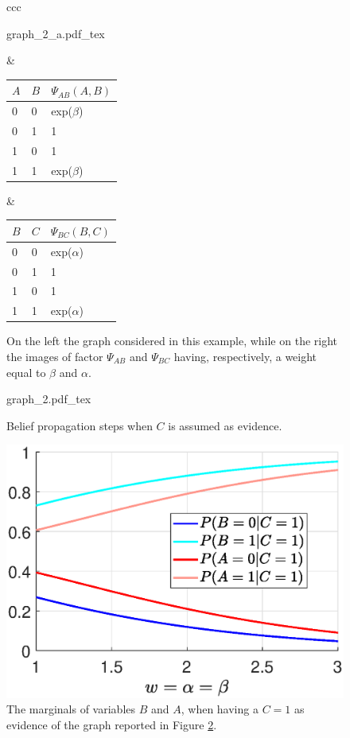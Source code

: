 \begin{figure}
\begin{tabular}{ccc}
\begin{minipage}[t]{0.25 \columnwidth}
	\centering
\def\svgwidth{0.9 \textwidth}
{graph_2_a.pdf_tex} 
\end{minipage} 
 & 
\begin{minipage}[t]{0.3 \columnwidth}
\begin{tabular}{|l|l|l|}
$A$ & $B$ & $\Psi_{AB}(A,B)$ \\
\hline
0 & 0 & exp($\beta$) \\
\hline
0 & 1 & 1 \\
\hline
1 & 0 & 1 \\
\hline
1 & 1 & exp($\beta$) \\
\hline
\end{tabular}
\end{minipage} 
 & 
\begin{minipage}[t]{0.3 \columnwidth}
\begin{tabular}{|l|l|l|}
$B$ & $C$ & $\Psi_{BC}(B,C)$ \\
\hline
0 & 0 & exp($\alpha$) \\
\hline
0 & 1 & 1 \\
\hline
1 & 0 & 1 \\
\hline
1 & 1 & exp($\alpha$) \\
\hline
\end{tabular}
\end{minipage} 
\end{tabular}
\caption{On the left the graph considered in this example, while on the right the images of factor $\Psi_{AB}$ and $\Psi_{BC}$ having, respectively, a weight equal to $\beta$  and $\alpha$. }
\label{fig:sample_02:1}
\end{figure}

\begin{figure}
	\centering
\def\svgwidth{0.65 \textwidth}
{graph_2.pdf_tex} 
\caption{Belief propagation steps when $C$ is assumed as evidence.}
\label{fig:sample_02:2}
\end{figure}

\begin{figure}
	\centering
\includegraphics[width=0.48\columnwidth]{../Chapter_additional/03_Samples/image_02/chain_corr.eps}
\caption{The marginals of variables $B$ and $A$, when having a $C=1$ as evidence of the graph reported in Figure \ref{fig:sample_02:2}.}
\label{fig:sample_02:3}
\end{figure} 

